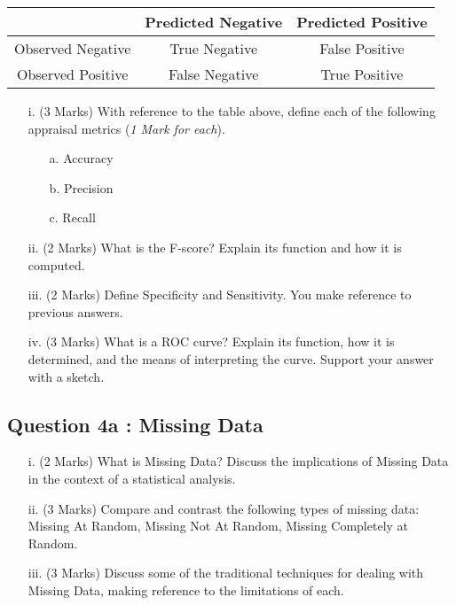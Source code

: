 \documentclass[a4paper,12pt]{article}
\begin{document}
\begin{center}
\begin{tabular}{|c|c|c|}
\hline  & Predicted Negative & Predicted Positive \\ 
\hline Observed Negative & True Negative & False Positive \\ 
\hline Observed Positive & False Negative & True Positive \\ 
\hline 
\end{tabular} 
\end{center}
\begin{itemize}
\item[i.](3 Marks) With reference to the table above, define each of the following appraisal metrics (\textit{1 Mark for each}).
\begin{itemize}
    \item[a.] Accuracy
    \item[b.] Precision
    \item[c.] Recall
    \end{itemize}
\item[ii.](2 Marks) What is the F-score? Explain its function and how it is computed.
\item[iii.](2 Marks) Define Specificity and Sensitivity. You make reference to previous answers.
\item[iv.](3 Marks) What is a ROC curve? Explain its function, how it is determined, and the means of interpreting the curve. Support your answer with a sketch.
\end{itemize}

\newpage

\subsection*{Question 4a : Missing Data}%
\begin{itemize}
\item[i.](2 Marks) What is Missing Data? Discuss the implications of Missing Data in the context of a statistical analysis.
\item[ii.](3 Marks) Compare and contrast the following types of missing data: Missing At Random, Missing Not At Random, Missing Completely at Random.
\item[iii.](3 Marks) Discuss some of the traditional techniques for dealing with Missing Data, making reference to the limitations of each.
\end{itemize}
\end{document}
